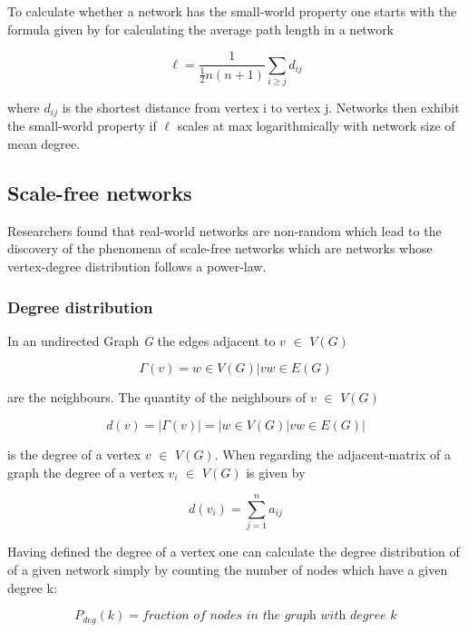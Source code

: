 \documentclass[../Bachelorarbeit.tex]{subfiles}
\begin{document}
\medskip

To calculate whether a network has the small-world property one starts with the formula given by \cite{Newman_ComplexNetworks} for calculating the average path length in a network

\begin{equation}
\ell = \frac{1}{\frac{1}{2}n(n+1)} \displaystyle\sum_{i \geq j }^{} d_{ij}
\end{equation}

where $d_{ij}$ is the shortest distance from vertex i to vertex j. Networks then exhibit the small-world property if $\ell$ scales at max logarithmically with network size of mean degree.

\subsection{Scale-free networks}
Researchers found that real-world networks are non-random which lead to the discovery of the phenomena of scale-free networks which are networks whose vertex-degree distribution follows a power-law.

\subsubsection{Degree distribution}
In an undirected Graph \textit{G} the edges adjacent to $v$ $\in$ $V(G)$ 

\begin{equation}
\Gamma(v) = {w \in V(G) | vw \in E(G)}
\end{equation}

are the neighbours. The quantity of the neighbours of $v$ $\in$ $V(G)$ 

\begin{equation}
d(v) = |\Gamma(v)| = |{w \in V(G) | vw \in E(G)}|
\end{equation}

is the degree of a vertex $v$ $\in$ $V(G)$. When regarding the adjacent-matrix of a graph the degree of a vertex $v_i$ $\in$ $V(G)$ is given by

\begin{equation}
d(v_i) = \displaystyle\sum_{j=1}^{n} a_{ij}
\end{equation}

Having defined the degree of a vertex one can calculate the degree distribution of of a given network simply by counting the number of nodes which have a given degree k:

\begin{equation}
P_{deg}(k) = \textit{fraction of nodes in the graph with degree k}
\end{equation}
\end{document}
